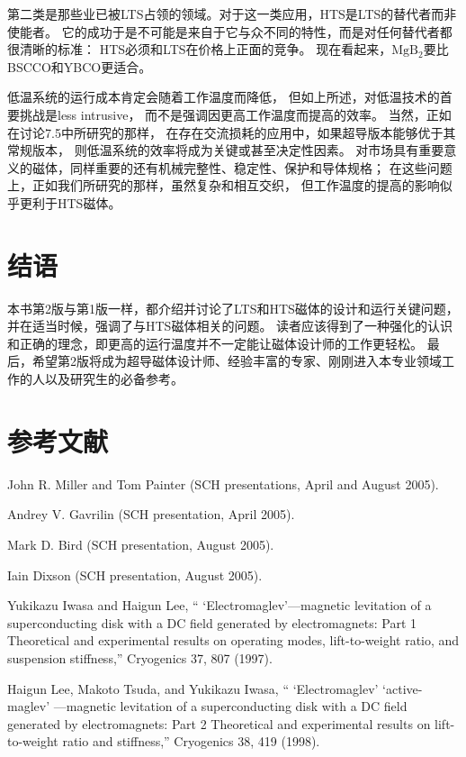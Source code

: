 第二类是那些业已被LTS占领的领域。对于这一类应用，HTS是LTS的替代者而非使能者。
它的成功于是不可能是来自于它与众不同的特性，而是对任何替代者都很清晰的标准：
HTS必须和LTS在价格上正面的竞争。
现在看起来，$\mathrm{MgB_2}$要比BSCCO和YBCO更适合。
	
低温系统的运行成本肯定会随着工作温度而降低，
但如上所述，对低温技术的首要挑战是less intrusive，
而不是强调因更高工作温度而提高的效率。
当然，正如在讨论7.5中所研究的那样，
在存在交流损耗的应用中，如果超导版本能够优于其常规版本，
则低温系统的效率将成为关键或甚至决定性因素。
对市场具有重要意义的磁体，同样重要的还有机械完整性、稳定性、保护和导体规格；
在这些问题上，正如我们所研究的那样，虽然复杂和相互交织，
但工作温度的提高的影响似乎更利于HTS磁体。	

\section{结语}
本书第2版​​与第1版一样，都介绍并讨论了LTS和HTS磁体的设计和运行关键问题，
并在适当时候，强调了与HTS磁体相关的问题。
读者应该得到了一种强化的认识和正确的理念，即更高的运行温度并不一定能让磁体设计师的工作更轻松。
最后，希望第2版将成为超导磁体设计师、经验丰富的专家、刚刚进入本专业领域工作的人以及研究生的必备参考。

\section*{参考文献}
\noindent [9.1] John R. Miller and Tom Painter (SCH presentations, April and August 2005).

\noindent [9.2] Andrey V. Gavrilin (SCH presentation, April 2005).

\noindent [9.3] Mark D. Bird (SCH presentation, August 2005).

\noindent [9.4] Iain Dixson (SCH presentation, August 2005).

\noindent [9.5] Yukikazu Iwasa and Haigun Lee, `` ‘Electromaglev’—magnetic levitation of a superconducting
disk with a DC field generated by electromagnets: Part 1 Theoretical
and experimental results on operating modes, lift-to-weight ratio, and suspension
stiffness,” Cryogenics 37, 807 (1997).

\noindent [9.6] Haigun Lee, Makoto Tsuda, and Yukikazu Iwasa, `` ‘Electromaglev’ ‘active-maglev’ —magnetic levitation of a superconducting disk with a DC field generated by electromagnets: Part 2 Theoretical and experimental results on lift-to-weight ratio and stiffness,” Cryogenics 38, 419 (1998).

